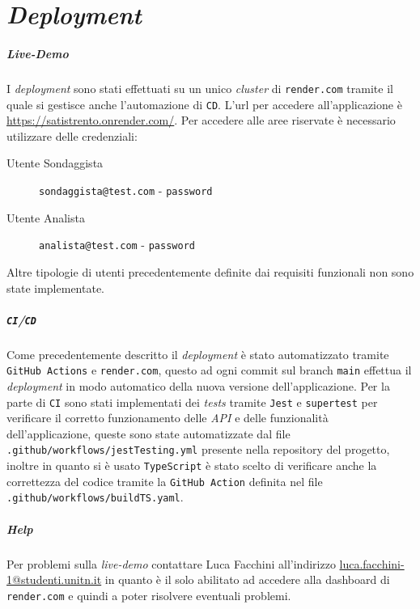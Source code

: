 \chapter{\textit{Deployment}}

\paragraph{\textit{Live-Demo}} I \textit{deployment} sono stati effettuati su un unico \textit{cluster} di \texttt{render.com} tramite il quale si gestisce anche l'automazione di \texttt{CD}. L'url per accedere all'applicazione è \url{https://satistrento.onrender.com/}. Per accedere alle aree riservate è necessario utilizzare delle credenziali:
\begin{description}
    \item[Utente Sondaggista] \texttt{sondaggista@test.com} - \texttt{password}
    \item[Utente Analista] \texttt{analista@test.com} - \texttt{password}
\end{description}
Altre tipologie di utenti precedentemente definite dai requisiti funzionali non sono state implementate.


\paragraph{\texttt{CI}/\texttt{CD}}
    Come precedentemente descritto il \textit{deployment} è stato automatizzato tramite \texttt{GitHub Actions} e \texttt{render.com}, questo ad ogni commit sul branch \texttt{main} effettua il \textit{deployment} in modo automatico della nuova versione dell'applicazione. \newline
    Per la parte di \texttt{CI} sono stati implementati dei \textit{tests} tramite \texttt{Jest} e \texttt{supertest} per verificare il corretto funzionamento delle \textit{API} e delle funzionalità dell'applicazione, queste sono state automatizzate dal file \texttt{.github/workflows/jestTesting.yml} presente nella repository del progetto, inoltre in quanto si è usato \texttt{TypeScript} è stato scelto di verificare anche la correttezza del codice tramite la \texttt{GitHub Action} definita nel file \texttt{.github/workflows/buildTS.yaml}.

\paragraph{\textit{Help}}
    Per problemi sulla \textit{live-demo} contattare Luca Facchini all'indirizzo \href{mailto:luca.facchini-1@studenti.unitn.it}{luca.facchini-1@studenti.unitn.it} in quanto è il solo abilitato ad accedere alla dashboard di \texttt{render.com} e quindi a poter risolvere eventuali problemi.